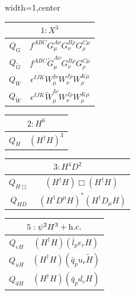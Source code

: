 \begin{table}[H]
\hspace{-0.5cm}
\begin{center}
\begin{adjustbox}{width=1\textwidth,center}
\small
\begin{minipage}[t]{4.45cm}
\renewcommand{\arraystretch}{1.5}
\begin{tabular}[t]{c|c}
\multicolumn{2}{c}{\boldmath$1:X^3$} \\
\hline
$Q_G$                & $f^{ABC} G_\mu^{A\nu} G_\nu^{B\rho} G_\rho^{C\mu} $ \\
%
$Q_{\widetilde G}$          & $f^{ABC} \widetilde G_\mu^{A\nu} G_\nu^{B\rho} G_\rho^{C\mu} $ \\
%
$Q_W$                & $\epsilon^{IJK} W_\mu^{I\nu} W_\nu^{J\rho} W_\rho^{K\mu}$ \\ 
%
$Q_{\widetilde W}$          & $\epsilon^{IJK} \widetilde W_\mu^{I\nu} W_\nu^{J\rho} W_\rho^{K\mu}$ \\
\end{tabular}
\end{minipage}
%
%
\begin{minipage}[t]{2.7cm}
\renewcommand{\arraystretch}{1.5}
\begin{tabular}[t]{c|c}
\multicolumn{2}{c}{\boldmath$2:H^6$} \\
\hline
$Q_H$       & $(H^\dag H)^3$ 
\end{tabular}
\end{minipage}
%
%
\begin{minipage}[t]{5.1cm}
\renewcommand{\arraystretch}{1.5}
\begin{tabular}[t]{c|c}
\multicolumn{2}{c}{\boldmath$3:H^4 D^2$} \\
\hline
$Q_{H\Box}$ & $(H^\dag H)\Box(H^\dag H)$ \\
%
$Q_{H D}$   & $\ \left(H^\dag D^\mu H\right)^* \left(H^\dag D_\mu H\right)$ 
\end{tabular}
\end{minipage}
%
%
\begin{minipage}[t]{2.7cm}
\renewcommand{\arraystretch}{1.5}
\begin{tabular}[t]{c|c}
\multicolumn{2}{c}{\boldmath$5: \psi^2H^3 + \mathrm{h.c.}$} \\
\hline
$Q_{eH}$           & $(H^\dag H)(\bar l_p e_r H)$ \\
%
$Q_{uH}$          & $(H^\dag H)(\bar q_p u_r \widetilde H )$ \\
%
$Q_{dH}$           & $(H^\dag H)(\bar q_p d_r H)$\\
\end{tabular}
\end{minipage}


\end{adjustbox}
\end{center}
\end{table}
